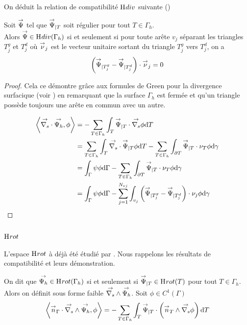 On déduit la relation de compatibilité \(\mathrm{H}_\mathrm{{}}{div}\) suivante (\cite[Lemme.~8]{nedelec_mixed_1980})
\begin{prop}
    \label{prop:annex:hdiv_hrot:hdiv}
    Soit \({\overset{\rightarrow}{\Psi}}\) tel que \({\overset{\rightarrow}{\Psi}}_{|T}\) soit régulier pour tout \(T\in\Gamma_h\).\\
    Alors \({\overset{\rightarrow}{\Psi}} \in \mathrm{H}_\mathrm{{}}{div}(\Gamma_h)\) si et seulement si pour toute arête \(v_j\) séparant les triangles \(T_j^g\) et \(T_j^d\) où \({\overset{\rightarrow}{\nu}}_j\) est le vecteur unitaire sortant du triangle \(T_j^g\) vers \(T_j^d\), on a
    \begin{equation}
        \left( {\overset{\rightarrow}{\Psi}}_{|T_j^g} - {\overset{\rightarrow}{\Psi}}_{|T_j^d} \right ) \cdot {\overset{\rightarrow}{\nu}}_j = 0
    \end{equation}
\end{prop}
    
\begin{proof}
    Cela ce démontre grâce aux formules de Green pour la divergence surfacique (voir \cite[eq.~(A3.47)]{bladel_electromagnetic_2007}) en remarquant que la surface \(\Gamma_h\) est fermée et qu'un triangle possède toujours une arête en commun avec un autre.

    \begin{align}
    \left< {\overset{\rightarrow}{\nabla_s}} \cdot {\overset{\rightarrow}{\Psi_h}}, \phi \right> 
    & = - \sum_{T\in\Gamma_h} \int_T {\overset{\rightarrow}{\Psi}}_{|T} \cdot {\overset{\rightarrow}{\nabla_s}} \phi\mathrm{d}{T} \\
    & = \sum_{T\in\Gamma_h} \int_T {\overset{\rightarrow}{\nabla_s}} \cdot {\overset{\rightarrow}{\Psi}}_{|T} \phi \mathrm{d}{T} - \sum_{T\in\Gamma_h} \int_{\partial T} {\overset{\rightarrow}{\Psi}}_{|T} \cdot \nu_T \phi \mathrm{d}{\gamma} \\
    & = \int_\Gamma \psi \phi \mathrm{d}{\Gamma} - \sum_{T\in\Gamma_h} \int_{\partial T} {\overset{\rightarrow}{\Psi}}_{|T} \cdot \nu_T \phi \mathrm{d}{\gamma} \\
    & = \int_\Gamma \psi \phi \mathrm{d}{\Gamma} - \sum_{j=1}^{N_{vj}} \int_{v_j} \left( {\overset{\rightarrow}{\Psi}}_{|T_j^g} - {\overset{\rightarrow}{\Psi}}_{|T_j^d} \right) \cdot \nu_j \phi \mathrm{d}{\gamma} 
    \end{align}
\end{proof}

\subsection[Hrot]{\(\mathrm{H}_\mathrm{{}}{rot}\)}

L'espace \(\mathrm{H}_\mathrm{{}}{rot}\) à déjà été étudié par \cite[Lemme.~ 6]{nedelec_mixed_1980}. Nous rappelons les résultats de compatibilité et leurs démonstration.

\begin{defn}
    On dit que \({\overset{\rightarrow}{\Psi_h}} \in \mathrm{H}_\mathrm{{}}{rot}(\Gamma_h)\) si et seulement si \({\overset{\rightarrow}{\Psi}}_{|T} \in \mathrm{H}_\mathrm{{}}{rot}(T)\) pour tout \(T \in \Gamma_h\).\\
    Alors on définit sous forme faible \({\overset{\rightarrow}{\nabla_s}} \wedge {\overset{\rightarrow}{\Psi_h}} \).
    Soit \(\phi \in C^1(\Gamma)\) 
    \begin{equation}
        \left< \vn_\Gamma \cdot \vrots \vect{\Psi_h}, \phi \right> %
        = - \sum_{T\in\Gamma_h} \int_T \vect{\Psi}_{|T}  \cdot \left( \vn_T \pvect \vgrads \phi \right) \dd{T}
    \end{equation}
\end{defn}

